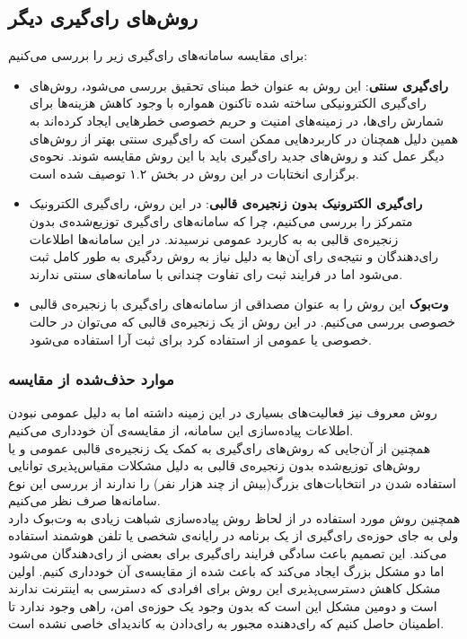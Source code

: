 \subsection{روش‌های رای‌گیری دیگر}
برای مقایسه سامانه‌های رای‌گیری زیر را بررسی می‌کنیم:
\begin{itemize}
	\item 
	\textbf{رای‌گیری سنتی}:
	این روش به عنوان خط مبنای تحقیق بررسی می‌شود، روش‌های رای‌گیری الکترونیکی ساخته شده تاکنون همواره با وجود کاهش هزینه‌ها برای شمارش رای‌ها، در زمینه‌های امنیت و حریم خصوصی خطرهایی ایجاد کرده‌اند به همین دلیل همچنان در کاربردهایی ممکن است که رای‌گیری سنتی بهتر از روش‌های دیگر عمل کند و روش‌های جدید رای‌گیری باید با این روش مقایسه شوند. نحوه‌ی برگزاری انختابات در این روش در بخش ۱.۲ توصیف شده است. 
	\item \textbf{رای‌‌گیری الکترونیک بدون زنجیره‌ی قالبی}:
	در این روش، رای‌گیری الکترونیک متمرکز را بررسی می‌کنیم، چرا که سامانه‌های رای‌گیری توزیع‌شده‌ی بدون زنجیره‌ی قالبی به به کاربرد عمومی نرسیدند. در این سامانه‌ها اطلاعات رای‌دهندگان و نتیجه‌ی رای آن‌ها به دلیل نیاز به روش ردگیری به طور کامل ثبت می‌شود اما در فرایند ثبت رای تفاوت چندانی با سامانه‌های سنتی ندارند.
 	\item \textbf{وت‌بوک}
 	این روش را به عنوان مصداقی از سامانه‌های رای‌گیری با زنجیره‌ی قالبی خصوصی بررسی می‌کنیم. 
 	در این روش از یک‌ زنجیره‌ی قالبی که می‌توان در حالت خصوصی یا عمومی از استفاده کرد برای ثبت آرا استفاده می‌شود. 
\end{itemize}
\subsubsection{موارد حذف‌شده از مقایسه}
 	 روش‌ معروف  نیز فعالیت‌های بسیاری در این زمینه داشته اما به دلیل عمومی نبودن اطلاعات پیاده‌سازی این سامانه‌، از مقایسه‌ی آن خود‌داری می‌کنیم. 
 	 \\
 	 همچنین از آن‌جایی که روش‌های رای‌گیری به کمک یک زنجیره‌ی قالبی عمومی و یا روش‌های توزیع‌شده بدون زنجیره‌ی قالبی به دلیل مشکلات مقیاس‌پذیری توانایی استفاده شدن در انتخابات‌های بزرگ(بیش از چند هزار نفر) را ندارند از بررسی این نوع سامانه‌ها صرف نظر می‌کنیم.
 	 \\
 	 همچنین روش مورد استفاده در  از لحاظ روش پیاده‌سازی شباهت زیادی به وت‌بوک دارد ولی به جای حوزه‌ی رای‌گیری از یک برنامه در رایانه‌ی شخصی یا تلفن هوشمند استفاده می‌کند. این تصمیم باعث سادگی فرایند رای‌گیری برای بعضی از رای‌دهندگان می‌شود اما دو مشکل بزرگ ایجاد می‌کند که باعث شده از مقایسه‌ی آن خودداری کنیم. اولین مشکل کاهش دسترسی‌پذیری این روش برای افرادی که دسترسی به اینترنت ندارند است و دومین مشکل این است که بدون وجود یک حوزه‌ی امن، راهی وجود ندارد تا اطمینان حاصل کنیم که رای‌دهنده مجبور به رای‌دادن به کاندیدای خاصی نشده است.

